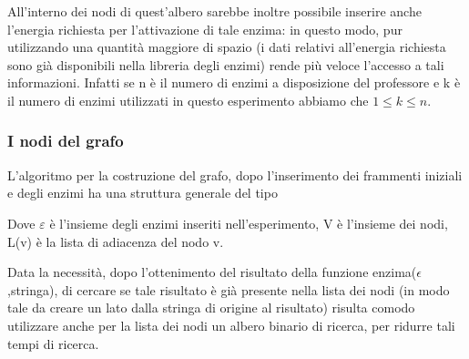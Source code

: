 \documentclass[a4paper,10pt]{article}
\begin{document}
All'interno dei nodi di quest'albero sarebbe inoltre possibile inserire anche l'energia richiesta per l'attivazione di tale enzima: in questo modo, pur utilizzando una quantità maggiore di spazio (i dati relativi all'energia richiesta sono già disponibili nella libreria degli enzimi) rende più veloce l'accesso a tali informazioni. Infatti se n è il numero di enzimi a disposizione del professore e k è il numero di enzimi utilizzati in questo esperimento abbiamo che $1\le k \le n$.

\subsubsection{I nodi del grafo}\label{sec:nodi}
L'algoritmo per la costruzione del grafo, dopo l'inserimento dei frammenti iniziali e degli enzimi ha una struttura generale del tipo

\begin{algorithm}[H]
\end{algorithm}
Dove $\varepsilon$ è l'insieme degli enzimi inseriti nell'esperimento, V è l'insieme dei nodi, L(v) è la lista di adiacenza del nodo v.

Data la necessità, dopo l'ottenimento del risultato della funzione enzima($\epsilon$,stringa), di cercare se tale risultato è già presente nella lista dei nodi (in modo tale da creare un lato dalla stringa di origine al risultato) risulta comodo utilizzare anche per la lista dei nodi un albero binario di ricerca, per ridurre tali tempi di ricerca.
\end{document}
